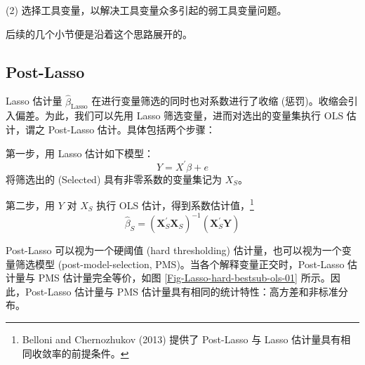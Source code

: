 (2) 选择工具变量，以解决工具变量众多引起的弱工具变量问题。

\vspace{5pt}

后续的几个小节便是沿着这个思路展开的。



\subsection{Post-Lasso}\label{sec:lasso-post-lasso}

Lasso 估计量 $\widehat{\beta}_{\text{Lasso}}$ 在进行变量筛选的同时也对系数进行了收缩 (惩罚)。收缩会引入偏差。为此，我们可以先用 Lasso 筛选变量，进而对选出的变量集执行 OLS 估计，谓之 Post-Lasso 估计。具体包括两个步骤：


第一步，用 Lasso 估计如下模型：
$$Y=X^{\prime} \beta+e$$
将筛选出的 (Selected) 具有非零系数的变量集记为 $X_{S}$。

第二步，用 $Y$ 对 $X_{S}$ 执行 OLS 估计，得到系数估计值，\footnote{%
   Belloni and Chernozhukov (2013) 提供了 Post-Lasso 与 Lasso 估计量具有相同收敛率的前提条件。}
$$\widehat{\beta}_{S}=\left(\boldsymbol{X}_{S}^{\prime} \boldsymbol{ X}_{S}\right)^{-1}\left(\boldsymbol{X}_{S}^{\prime} \boldsymbol{Y}\right)$$

Post-Lasso 可以视为一个硬阈值 (hard thresholding) 估计量，也可以视为一个变量筛选模型 (post-model-selection, PMS)。当各个解释变量正交时，Post-Lasso 估计量与 PMS 估计量完全等价，如图 \ref{Fig-Lasso-hard-bestsub-ols-01} 所示。因此，Post-Lasso 估计量与 PMS 估计量具有相同的统计特性：高方差和非标准分布。

